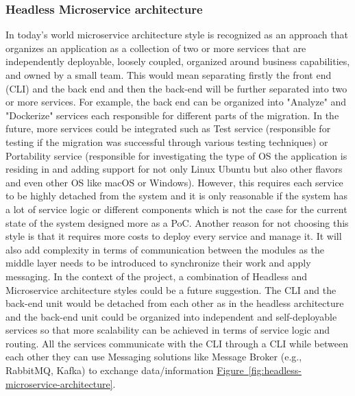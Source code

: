 \documentclass{article}
\newcommand{\FigRef}[1]{\hyperref[#1]{Figure~\ref{#1}}}
\begin{document}
\begin{multicols}{2}
\subsubsection{Headless Microservice architecture}
In today's world microservice architecture style is recognized as an approach that organizes an application as a collection of two or more services that are independently deployable, loosely coupled, organized around business capabilities, and owned by a small team. This would mean separating firstly the front end (CLI) and the back end and then the back-end will be further separated into two or more services. For example, the back end can be organized into "Analyze" and "Dockerize" services each responsible for different parts of the migration. In the future, more services could be integrated such as Test service (responsible for testing if the migration was successful through various testing techniques) or Portability service (responsible for investigating the type of OS the application is residing in and adding support for not only Linux Ubuntu but also other flavors and even other OS like macOS or Windows). However, this requires each service to be highly detached from the system and it is only reasonable if the system has a lot of service logic or different components which is not the case for the current state of the system designed more as a PoC. Another reason for not choosing this style is that it requires more costs to deploy every service and manage it. It will also add complexity in terms of communication between the modules as the middle layer needs to be introduced to synchronize their work and apply messaging. In the context of the project, a combination of Headless and Microservice architecture styles could be a future suggestion. The CLI and the back-end unit would be detached from each other as in the headless architecture and the back-end unit could be organized into independent and self-deployable services so that more scalability can be achieved in terms of service logic and routing. All the services communicate with the CLI through a CLI while between each other they can use Messaging solutions like Message Broker (e.g., RabbitMQ, Kafka) to exchange data/information \FigRef{fig:headless-microservice-architecture}.


\end{multicols}
\end{document}

